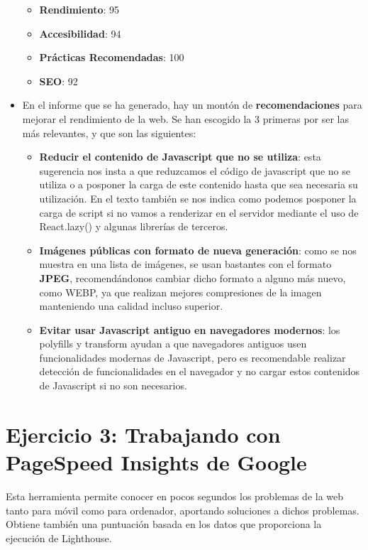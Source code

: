 \begin{itemize}
    \begin{itemize}
        \item \textbf{Rendimiento}: 95
        \item \textbf{Accesibilidad}: 94
        \item \textbf{Prácticas Recomendadas}: 100
        \item \textbf{SEO}: 92
    \end{itemize}

    \item En el informe que se ha generado, hay un montón de \textbf{recomendaciones} para mejorar el rendimiento de la web. Se han escogido
    la 3 primeras por ser las más relevantes, y que son las siguientes:

    \begin{itemize}
        \item \textbf{Reducir el contenido de Javascript que no se utiliza}: esta sugerencia nos insta a que reduzcamos el código de javascript que no se utiliza o a posponer la carga de este contenido hasta que sea necesaria su utilización. En el texto también se nos indica como podemos posponer la carga de script si no vamos a renderizar en el servidor mediante el uso de React.lazy() y algunas librerías de terceros.

        \item \textbf{Imágenes públicas con formato de nueva generación}: como se nos muestra en una lista de imágenes, se usan bastantes con el formato \textbf{JPEG}, recomendándonos cambiar dicho formato a alguno más nuevo, como WEBP, ya que realizan mejores compresiones de la imagen manteniendo una calidad incluso superior.

        \item \textbf{Evitar usar Javascript antiguo en navegadores modernos}: los polyfills y transform ayudan a que navegadores antiguos usen funcionalidades modernas de Javascript, pero es recomendable realizar detección de funcionalidades en el navegador y no cargar estos contenidos de Javascript si no son necesarios.
    \end{itemize}
\end{itemize}

\section{Ejercicio 3: Trabajando con PageSpeed Insights de Google}
Esta herramienta permite conocer en pocos segundos los problemas de la web tanto para móvil como para ordenador, aportando soluciones a dichos problemas. Obtiene también una puntuación basada en los datos que proporciona la ejecución de Lighthouse.

